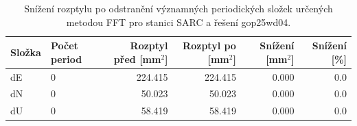 \begin{table}[htbp]
\caption{Snížení rozptylu po odstranění významných periodických složek určených metodou FFT pro stanici SARC a řešení gop25wd04.}
\label{tab:gop25wd04_stcd_sarc_detr_weighted_1seg_spectral_fft_variance_reduction}
\begin{tabular}{llrrrr}
\toprule
Složka & Počet period & Rozptyl před [mm$^2$] & Rozptyl po [mm$^2$] & Snížení [mm$^2$] & Snížení [\%] \\
\midrule
dE & 0 & 224.415 & 224.415 & 0.000 & 0.0 \\
dN & 0 & 50.023 & 50.023 & 0.000 & 0.0 \\
dU & 0 & 58.419 & 58.419 & 0.000 & 0.0 \\
\bottomrule
\end{tabular}
\end{table}
